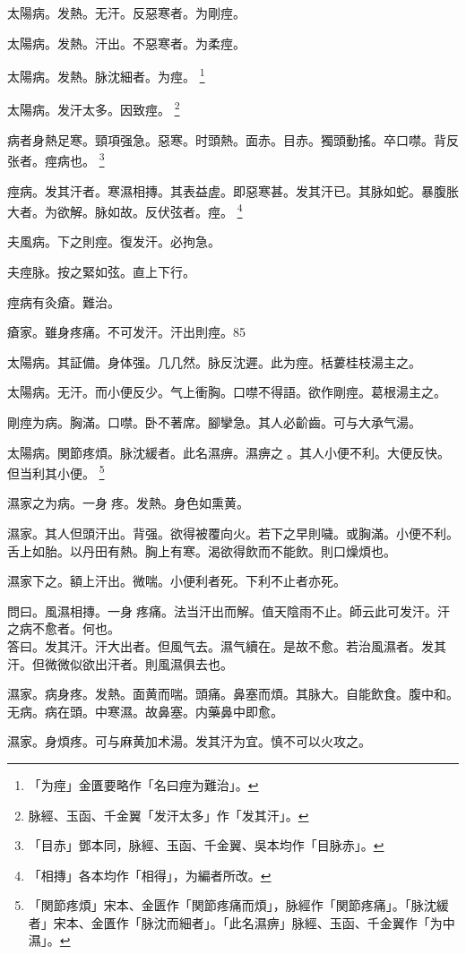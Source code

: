 太陽病。发熱。无汗。反惡寒者。为剛痙。

太陽病。发熱。汗出。不惡寒者。为柔痙。

太陽病。发熱。脉沈細者。为痙。
	\footnote{「为痙」金匱要略作「名曰痙为難治」。}

太陽病。发汗太多。因致痙。
	\footnote{脉經、玉函、千金翼「发汗太多」作「发其汗」。}

病者身熱足寒。頸項强急。惡寒。时頭熱。面赤。目赤。獨頭動搖。卒口噤。背反张者。痙病也。
	\footnote{「目赤」鄧本同，脉經、玉函、千金翼、吳本均作「目脉赤」。}

痙病。发其汗者。寒濕相摶。其表益虗。即惡寒甚。发其汗已。其脉如蛇。暴腹胀大者。为欲解。脉如故。反伏弦者。痙。
	\footnote{「相摶」各本均作「相得」，为編者所改。}

夫風病。下之則痙。復发汗。必拘急。

夫痙脉。按之緊如弦。直上下行。

痙病有灸瘡。難治。

瘡家。雖身疼痛。不可发汗。汗出則痙。85

太陽病。其証備。身体强。几几然。脉反沈遲。此为痙。栝蔞桂枝湯主之。

太陽病。无汗。而小便反少。气上衝胸。口噤不得語。欲作剛痙。葛根湯主之。

{\khaaitp 剛}痙为病。胸滿。口噤。卧不著席。腳攣急。其人必齘齒。可与大承气湯。

太陽病。関節疼煩。脉沈緩者。此名濕痹。濕痹之{\sungtpii 𠊱}。其人小便不利。大便反快。但当利其小便。
	\footnote{
		「関節疼煩」宋本、金匮作「関節疼痛而煩」，脉經作「関節疼痛」。「脉沈緩者」宋本、金匱作「脉沈而細者」。「此名濕痹」脉經、玉函、千金翼作「为中濕」。
	}

濕家之为病。一身{\sungtpii 𥁞}疼。发熱。身色如熏黄。

濕家。其人但頭汗出。背强。欲得被覆向火。若下之早則噦。{\khaaitp 或}胸滿。小便{\khaaitp 不}利。舌上如胎。以丹田有熱。胸上有寒。渴欲得飲而不能飲。則口燥{\khaaitp 煩}也。

濕家下之。額上汗出。微喘。小便利者死。下利不止者亦死。

問曰。風濕相摶。一身{\sungtpii 𥁞}疼痛。法当汗出而解。值天陰雨不止。師云此可发汗。汗之病不愈者。何也。\\
答曰。发其汗。汗大出者。但風气去。濕气續在。是故不愈。若治風濕者。发其汗。但微微似欲出汗者。則風濕俱去也。

濕家。病身疼。发熱。面黄而喘。頭痛。鼻塞而煩。其脉大。自能飲食。腹中和。无病。病在頭。中寒濕。故鼻塞。内藥鼻中即愈。

濕家。身煩疼。可与麻黄加术湯。发其汗为宜。慎不可以火攻之。

